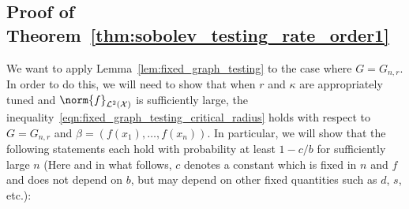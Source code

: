 \documentclass{article}
\newcommand{\1}{\mathbf{1}}
\newcommand{\Leb}{\mathcal{L}}
\theoremstyle{alden}
\theoremstyle{aldenthm}
\theoremstyle{definition}
\theoremstyle{remark}
\begin{document}
\subsection{Proof of Theorem~\ref{thm:sobolev_testing_rate_order1}}

We want to apply Lemma~\ref{lem:fixed_graph_testing} to the case where $G = G_{n,r}$. In order to do this, we will need to show that when $r$ and $\kappa$ are appropriately tuned and $\norm{f}_{\Leb^2(\mathcal{X})}$ is sufficiently large, the inequality~\eqref{eqn:fixed_graph_testing_critical_radius} holds with respect to $G = G_{n,r}$ and $\beta = (f(x_1),\ldots,f(x_n))$. In particular, we will show that the following statements each hold with probability at least $1 - c/b$ for sufficiently large $n$ (Here and in what follows, $c$ denotes a constant which is fixed in $n$ and $f$ and does not depend on $b$, but may depend on other fixed quantities such as $d$, $s$, etc.): 
\end{document}
